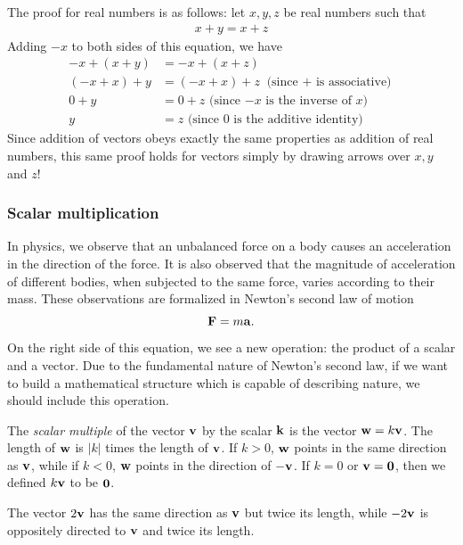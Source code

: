 \documentclass[12pt,letterpaper,reqno]{article}
\numberwithin{equation}{section}
\newcommand{\ti}[1]{\textit{#1}}
\begin{document}
\begin{pf}
The proof for real numbers is as follows: let $x,y,z$ be real numbers such that 
\begin{align*}
	x+y=x+z
\end{align*}
Adding $-x$ to both sides of this equation, we have
\begin{align*}
	-x+(x+y)&=-x+(x+z) \\
	(-x+x)+y&=(-x+x)+z \text{ (since $+$ is associative)} \\
	0+y&=0+z \text{ (since $-x$ is the inverse of $x$)} \\
	y&=z \text{ (since $0$ is the additive identity)}
\end{align*}
Since addition of vectors obeys exactly the same properties as addition of real numbers, this same proof holds for vectors simply by drawing arrows over $x,y$ and $z$!
\end{pf}

\subsubsection{Scalar multiplication}
In physics, we observe that an unbalanced force on a body causes an acceleration in the direction of the force. It is also observed that the magnitude of acceleration of different bodies, when subjected to the same force, varies according to their mass. These observations are formalized in Newton's second law of motion
\begin{equation}
	{\bf F}=m{\bf a}.
\end{equation}
On the right side of this equation, we see a new operation: the product of a scalar and a vector. Due to the fundamental nature of Newton's second law, if we want to build a mathematical structure which is capable of describing nature, we should include this operation.

\begin{defn}
The \ti{scalar multiple} of the vector ${\bf v}$ by the scalar ${\bf k}$ is the vector ${\bf w}=k{\bf v}$. The length of ${\bf w}$ is $|k|$ times the length of ${\bf v}$. If $k>0$, ${\bf w}$ points in the same direction as ${\bf v}$, while if $k<0$, ${\bf w}$ points in the direction of $-{\bf v}$. If $k=0$ or ${\bf v}={\bf 0}$, then we defined $k{\bf v}$ to be ${\bf 0}$.
\end{defn}

\begin{example}
The vector $2{\bf v}$ has the same direction as ${\bf v}$ but twice its length, while $-2{\bf v}$ is oppositely directed to ${\bf v}$ and twice its length.	
\end{example}
\end{document}

